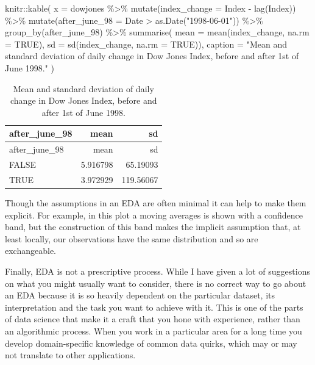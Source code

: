 \documentclass[
  letterpaper,
  DIV=11,
  numbers=noendperiod]{scrreprt}
\newenvironment{Shaded}{\begin{snugshade}}{\end{snugshade}}
\newcommand{\AttributeTok}[1]{\textcolor[rgb]{0.40,0.45,0.13}{#1}}
\newcommand{\ConstantTok}[1]{\textcolor[rgb]{0.56,0.35,0.01}{#1}}
\newcommand{\FunctionTok}[1]{\textcolor[rgb]{0.28,0.35,0.67}{#1}}
\newcommand{\NormalTok}[1]{\textcolor[rgb]{0.00,0.23,0.31}{#1}}
\newcommand{\SpecialCharTok}[1]{\textcolor[rgb]{0.37,0.37,0.37}{#1}}
\newcommand{\StringTok}[1]{\textcolor[rgb]{0.13,0.47,0.30}{#1}}
\begin{document}
\begin{Shaded}
\begin{Highlighting}[]
\NormalTok{knitr}\SpecialCharTok{::}\FunctionTok{kable}\NormalTok{(}
  \AttributeTok{x =}\NormalTok{ dowjones }\SpecialCharTok{\%\textgreater{}\%} 
  \FunctionTok{mutate}\NormalTok{(}\AttributeTok{index\_change =}\NormalTok{ Index }\SpecialCharTok{{-}} \FunctionTok{lag}\NormalTok{(Index)) }\SpecialCharTok{\%\textgreater{}\%}
  \FunctionTok{mutate}\NormalTok{(}\AttributeTok{after\_june\_98 =}\NormalTok{ Date }\SpecialCharTok{\textgreater{}} \FunctionTok{as.Date}\NormalTok{(}\StringTok{"1998{-}06{-}01"}\NormalTok{)) }\SpecialCharTok{\%\textgreater{}\%}
  \FunctionTok{group\_by}\NormalTok{(after\_june\_98) }\SpecialCharTok{\%\textgreater{}\%} 
  \FunctionTok{summarise}\NormalTok{(}
    \AttributeTok{mean =} \FunctionTok{mean}\NormalTok{(index\_change, }\AttributeTok{na.rm =} \ConstantTok{TRUE}\NormalTok{),}
    \AttributeTok{sd =} \FunctionTok{sd}\NormalTok{(index\_change, }\AttributeTok{na.rm =} \ConstantTok{TRUE}\NormalTok{)),}
  \AttributeTok{caption =} \StringTok{"Mean and standard deviation of daily change in Dow Jones Index, before and after 1st of June 1998."}
\NormalTok{)}
\end{Highlighting}
\end{Shaded}

\begin{longtable}[]{@{}lrr@{}}
\caption{Mean and standard deviation of daily change in Dow Jones Index,
before and after 1st of June 1998.}\tabularnewline
\toprule\noalign{}
after\_june\_98 & mean & sd \\
\midrule\noalign{}
\endfirsthead
\toprule\noalign{}
after\_june\_98 & mean & sd \\
\midrule\noalign{}
\endhead
\bottomrule\noalign{}
\endlastfoot
FALSE & 5.916798 & 65.19093 \\
TRUE & 3.972929 & 119.56067 \\
\end{longtable}

Though the assumptions in an EDA are often minimal it can help to make
them explicit. For example, in this plot a moving averages is shown with
a confidence band, but the construction of this band makes the implicit
assumption that, at least locally, our observations have the same
distribution and so are exchangeable.

Finally, EDA is not a prescriptive process. While I have given a lot of
suggestions on what you might usually want to consider, there is no
correct way to go about an EDA because it is so heavily dependent on the
particular dataset, its interpretation and the task you want to achieve
with it. This is one of the parts of data science that make it a craft
that you hone with experience, rather than an algorithmic process. When
you work in a particular area for a long time you develop
domain-specific knowledge of common data quirks, which may or may not
translate to other applications.
\end{document}
